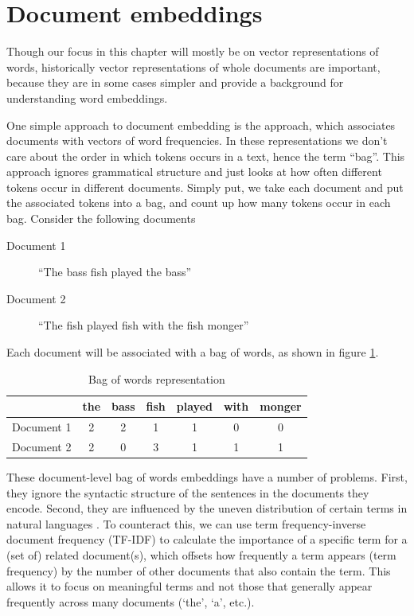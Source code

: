 \section{Document embeddings}

Though our focus in this chapter will mostly be on vector representations of words, historically vector representations of whole documents are important, because they are in some cases simpler and provide a background for understanding word embeddings.

One simple approach to document embedding is the  approach, which associates documents with vectors of word frequencies. In these representations we don't care about the order in which tokens occurs in a text, hence the term ``bag''. This approach ignores grammatical structure and just looks at how often different tokens occur in different documents.  Simply put, we take each document and put the associated tokens into a bag, and count up how many tokens occur in each bag. Consider the following documents

\begin{description}
\item[Document 1]  ``The bass fish played the bass''
\item[Document 2]  ``The fish played fish with the fish monger''
\end{description}

Each document will be associated with a bag of words, as shown in figure \ref{exampleBags}.

\begin{table}[h]
    \centering
    \begin{tabular}{|l|c|c|c|c|c|c|}
    \hline
     & the & bass & fish & played & with & monger \\
    \hline
    Document 1 & 2 & 2 & 1 & 1 & 0 & 0 \\
    \hline
    Document 2 & 2 & 0 & 3 & 1 & 1 & 1 \\
    \hline
    \end{tabular}
    \caption{Bag of words representation}
    \label{exampleBags}
\end{table}

These document-level bag of words embeddings have a number of problems. First, they ignore the syntactic structure of the sentences in the documents they encode.  Second, they are influenced by the uneven distribution of certain terms in natural languages \cite{piantadosi2014zipf, zipf1945meaning}. To counteract this, we can use term frequency-inverse document frequency (TF-IDF) to calculate the importance of a specific term for a (set of) related document(s), which offsets how frequently a term appears (term frequency) by the number of other documents that also contain the term. This allows it to focus on meaningful terms and not those that generally appear frequently across many documents (`the', `a', etc.). 

